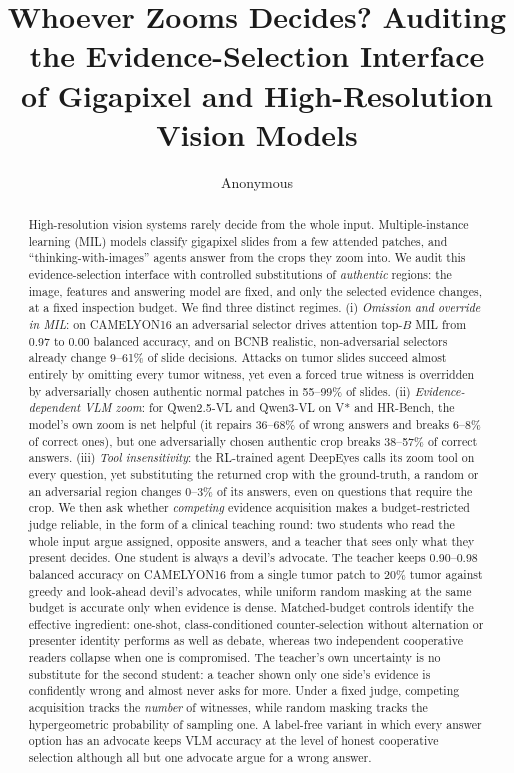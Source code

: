 \documentclass[10pt,twocolumn,letterpaper]{article}
\title{Whoever Zooms Decides? Auditing the Evidence-Selection Interface\\of Gigapixel and High-Resolution Vision Models}
\author{Anonymous}
\begin{document}
\maketitle

\begin{abstract}
High-resolution vision systems rarely decide from the whole input. Multiple-instance learning (MIL) models classify gigapixel slides from a few attended patches, and ``thinking-with-images'' agents answer from the crops they zoom into. We audit this evidence-selection interface with controlled substitutions of \emph{authentic} regions: the image, features and answering model are fixed, and only the selected evidence changes, at a fixed inspection budget.
We find three distinct regimes. (i) \emph{Omission and override in MIL}: on CAMELYON16 an adversarial selector drives attention top-$B$ MIL from 0.97 to 0.00 balanced accuracy, and on BCNB realistic, non-adversarial selectors already change 9--61\% of slide decisions. Attacks on tumor slides succeed almost entirely by omitting every tumor witness, yet even a forced true witness is overridden by adversarially chosen authentic normal patches in 55--99\% of slides. (ii) \emph{Evidence-dependent VLM zoom}: for Qwen2.5-VL and Qwen3-VL on V* and HR-Bench, the model's own zoom is net helpful (it repairs 36--68\% of wrong answers and breaks 6--8\% of correct ones), but one adversarially chosen authentic crop breaks 38--57\% of correct answers. (iii) \emph{Tool insensitivity}: the RL-trained agent DeepEyes calls its zoom tool on every question, yet substituting the returned crop with the ground-truth, a random or an adversarial region changes 0--3\% of its answers, even on questions that require the crop.
We then ask whether \emph{competing} evidence acquisition makes a budget-restricted judge reliable, in the form of a clinical teaching round: two students who read the whole input argue assigned, opposite answers, and a teacher that sees only what they present decides. One student is always a devil's advocate. The teacher keeps 0.90--0.98 balanced accuracy on CAMELYON16 from a single tumor patch to 20\% tumor against greedy and look-ahead devil's advocates, while uniform random masking at the same budget is accurate only when evidence is dense. Matched-budget controls identify the effective ingredient: one-shot, class-conditioned counter-selection without alternation or presenter identity performs as well as debate, whereas two independent cooperative readers collapse when one is compromised. The teacher's own uncertainty is no substitute for the second student: a teacher shown only one side's evidence is confidently wrong and almost never asks for more. Under a fixed judge, competing acquisition tracks the \emph{number} of witnesses, while random masking tracks the hypergeometric probability of sampling one. A label-free variant in which every answer option has an advocate keeps VLM accuracy at the level of honest cooperative selection although all but one advocate argue for a wrong answer.
\end{abstract}
\end{document}

